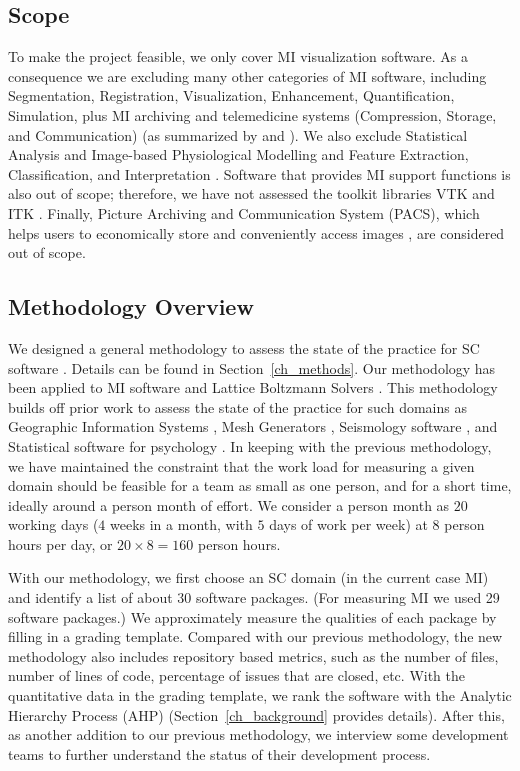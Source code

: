 \documentclass[final, 3p, times, authoryear]{elsarticle}
\begin{document}
\subsection{Scope} \label{sec_scope}

To make the project feasible, we only cover MI visualization software.  As a
consequence we are excluding many other categories of MI software, including
Segmentation, Registration, Visualization, Enhancement, Quantification,
Simulation, plus MI archiving and telemedicine systems (Compression, Storage,
and Communication) (as summarized by \citet{Bankman2000} and
\citet{Angenent2006}).  We also exclude Statistical Analysis and Image-based
Physiological Modelling \citep{enwiki:1034877594} and Feature Extraction,
Classification, and Interpretation \citep{Kim2011}. Software that provides MI
support functions is also out of scope; therefore, we have not assessed the
toolkit libraries VTK \citep{SchroederEtAl2006} and ITK \citep{McCormick2014}.
Finally, Picture Archiving and Communication System (PACS), which helps users to
economically store and conveniently access images \citep{Choplin1992}, are
considered out of scope. 

\subsection{Methodology Overview}

We designed a general methodology to assess the state of the practice for SC
software \citep{SmithEtAl2021, SmithAndMichalski2022}. Details can be found in
Section~\ref{ch_methods}.  Our methodology has been applied to MI software
\citep{Dong2021} and Lattice Boltzmann Solvers \citep{Michalski2021}.  This
methodology builds off prior work to assess the state of the practice for such
domains as Geographic Information Systems \citep{smith2018state}, Mesh
Generators \citep{smith2016state}, Seismology software
\citep{Smith2018Seismology}, and Statistical software for psychology
\citep{smith2018statistical}.  In keeping with the previous methodology, we have
maintained the constraint that the work load for measuring a given domain should
be feasible for a team as small as one person, and for a short time, ideally
around a person month of effort. We consider a person month as $20$ working
days ($4$ weeks in a month, with $5$ days of work per week) at $8$ person hours
per day, or $20 \times 8 = 160$ person hours.

With our methodology, we first choose an SC domain (in the current case MI) and
identify a list of about 30 software packages. (For measuring MI we used 29
software packages.)  We approximately measure the qualities of each package by
filling in a grading template. Compared with our previous methodology, the new
methodology also includes repository based metrics, such as the number of files,
number of lines of code, percentage of issues that are closed, etc.  With the
quantitative data in the grading template, we rank the software with the
Analytic Hierarchy Process (AHP) (Section~\ref{ch_background} provides details).
After this, as another addition to our previous methodology, we interview some
development teams to further understand the status of their development process.
\end{document}
